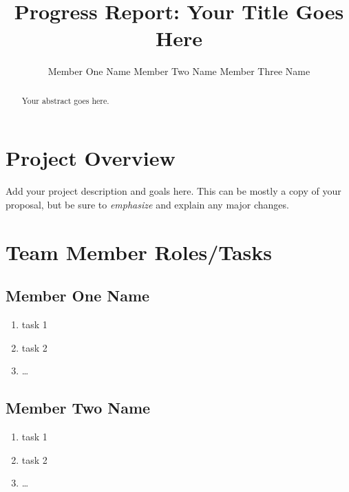 \documentclass[10pt,twocolumn,letterpaper]{article}
\begin{document}
\title{Progress Report: Your Title Goes Here}

\author{
Member One Name \hspace{1in} Member Two Name \hspace{1in} Member Three Name 
}
\maketitle

\begin{abstract}
  Your abstract goes here.
\end{abstract}

\section{Project Overview}

Add your project description and goals here. This can be mostly a copy of your proposal, but be sure to \emph{emphasize} and explain any major changes.

\section{Team Member Roles/Tasks}
\label{sec:roles}

\subsection{Member One Name}

\begin{enumerate}

\item task 1
\item task 2
\item \ldots

\end{enumerate}

\subsection{Member Two Name}

\begin{enumerate}

\item task 1
\item task 2
\item \ldots

\end{enumerate}
\end{document}
